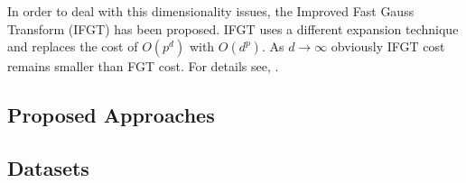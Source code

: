 \documentclass{article}
\begin{document}
In order to deal with this dimensionality issues, the Improved Fast Gauss Transform (IFGT) has  been proposed. IFGT uses a different expansion technique and replaces the cost of $O(p^d)$ with $O(d^p)$. As $d\rightarrow \infty$ obviously IFGT cost remains smaller than FGT cost. For details see, \cite{FGTkernel}.
\subsection{Proposed Approaches}

\subsection{Datasets}

\newpage


\end{document}

